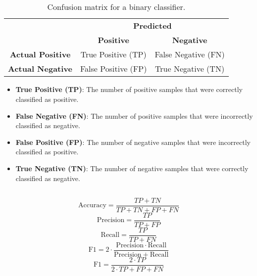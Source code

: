     \subsection{}
        \begin{table}[H]
            \centering
            \begin{tabular}{c|c|c|}
                \cline{2-3}
                & \multicolumn{2}{c|}{\textbf{Predicted}} \\ \cline{2-3} 
                & \textbf{Positive} & \textbf{Negative} \\ \hline
                \multicolumn{1}{|c|}{\textbf{Actual Positive}} & True Positive (TP) & False Negative (FN) \\ \hline
                \multicolumn{1}{|c|}{\textbf{Actual Negative}} & False Positive (FP) & True Negative (TN) \\ \hline
            \end{tabular}
            \caption{Confusion matrix for a binary classifier.}
            \label{tab:ML:binary_classifier:confusion_matrix}
        \end{table}
        \begin{itemize}
            \item \textbf{True Positive (TP)}: The number of positive samples that were correctly classified as positive.
            \item \textbf{False Negative (FN)}: The number of positive samples that were incorrectly classified as negative.
            \item \textbf{False Positive (FP)}: The number of negative samples that were incorrectly classified as positive.
            \item \textbf{True Negative (TN)}: The number of negative samples that were correctly classified as negative.
        \end{itemize}
    \subsection{}
        \begin{equation}
            \mathrm{Accuracy} = \frac{TP + TN}{TP + TN + FP + FN}
        \end{equation}
        \begin{equation}
            \mathrm{Precision} = \frac{TP}{TP + FP}
        \end{equation}
        \begin{equation}
            \mathrm{Recall} = \frac{TP}{TP + FN}
        \end{equation}
        \begin{equation}
            \mathrm{F1} = 2 \cdot \frac{\mathrm{Precision} \cdot \mathrm{Recall}}{\mathrm{Precision} + \mathrm{Recall}}
        \end{equation}
        \begin{equation}
            \mathrm{F1} = \frac{2 \cdot TP}{2 \cdot TP + FP + FN}
        \end{equation}